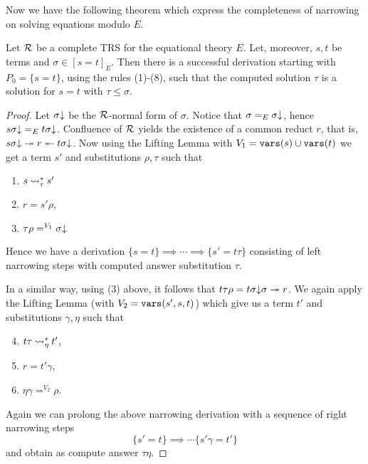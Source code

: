 Now we have the following theorem which express the completeness of narrowing on solving equations modulo $E$.
\begin{theorem}\label{theorem:narrowing-completeness}
    Let $\mathcal{R}$ be a complete TRS for the equational theory $E$. Let, moreover, $s, t$ be terms and $\sigma \in [s = t]_E$. Then there is a successful derivation starting with $P_0 = \{ s = t \}$, using the rules (1)-(8), such that the computed solution $\tau$ is a solution for $s = t$ with $\tau \leq \sigma$.

    \begin{proof}
        Let $\sigma\mathord{\downarrow}$ be the $\mathcal{R}$-normal form of $\sigma$. Notice that $\sigma =_{E} \sigma\mathord{\downarrow}$, hence $s \sigma\mathord{\downarrow} =_{E} t \sigma\mathord{\downarrow}$. Confluence of $\mathcal{R}$ yields the existence of a common reduct $r$, that is, $s\sigma\mathord{\downarrow} \twoheadrightarrow r \twoheadleftarrow t \sigma\mathord{\downarrow} $. Now using the Lifting Lemma with $V_1 = \mathtt{vars}(s) \cup \mathtt{vars}(t)$ we get a term $s'$ and substitutions $\rho, \tau$ such that
        \begin{enumerate}
            \item $s \mathbin{\rightsquigarrow}_\tau^* s'$
            \item $r = s' \rho$,
            \item $\tau \rho =^{V_1} \sigma\mathord{\downarrow}$
        \end{enumerate}
        Hence we have a derivation $\{s = t \} \implies \cdots \implies \{s' = t\tau\}$ consisting of left narrowing steps with computed answer substitution $\tau$.

        In a similar way, using (3) above, it follows that $t \tau \rho = t \sigma\mathord{\downarrow} \sigma \twoheadrightarrow r$. We again apply the Lifting Lemma (with $V_2 = \mathtt{vars}(s',s,t)$) which give us a term $t'$ and substitutions $\gamma, \eta$ such that
        \begin{enumerate}
            \setcounter{enumi}{3}
            \item $t \tau \mathbin{\rightsquigarrow}_{\eta}^{*} t'$,
            \item $r = t' \gamma$,
            \item $\eta \gamma =^{V_2} \rho$.
        \end{enumerate}
        Again we can prolong the above narrowing derivation with a sequence of right narrowing steps
        $$\{s' = t\} \implies \cdots \{s'\gamma = t'\}$$
        and obtain as compute answer $\tau \eta$.


\end{proof}
\end{theorem}
